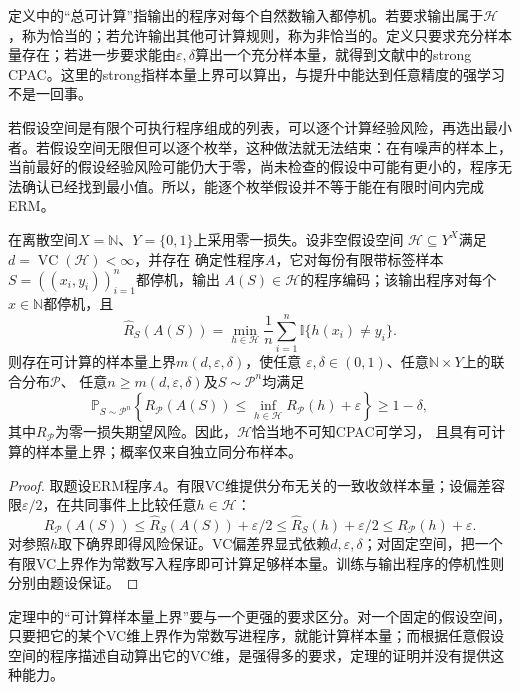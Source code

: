 定义中的“总可计算”指输出的程序对每个自然数输入都停机。若要求输出属于$\mathcal H$，称为恰当的；若允许输出其他可计算规则，称为非恰当的。定义只要求充分样本量存在；若进一步要求能由$\varepsilon,\delta$算出一个充分样本量，就得到文献中的strong CPAC。这里的strong指样本量上界可以算出，与提升中能达到任意精度的强学习不是一回事。

若假设空间是有限个可执行程序组成的列表，可以逐个计算经验风险，再选出最小者。若假设空间无限但可以逐个枚举，这种做法就无法结束：在有噪声的样本上，当前最好的假设经验风险可能仍大于零，尚未检查的假设中可能有更小的，程序无法确认已经找到最小值。所以，能逐个枚举假设并不等于能在有限时间内完成ERM。

\begin{theorem}[可计算ERM给出的学习保证]
\label{thm:computable-erm-pac}
在离散空间$X=\mathbb N$、$Y=\{0,1\}$上采用零一损失。设非空假设空间
$\mathcal H\subseteq Y^X$满足$d=\operatorname{VC}(\mathcal H)<\infty$，并存在
确定性程序$A$，它对每份有限带标签样本$S=((x_i,y_i))_{i=1}^n$都停机，输出
$A(S)\in\mathcal H$的程序编码；该输出程序对每个$x\in\mathbb N$都停机，且
\[
 \hat R_S(A(S))
 =\min_{h\in\mathcal H}\frac1n\sum_{i=1}^n\mathbb I\{h(x_i)\neq y_i\}.
\]
则存在可计算的样本量上界$m(d,\varepsilon,\delta)$，使任意
$\varepsilon,\delta\in(0,1)$、任意$\mathbb N\times Y$上的联合分布$\mathcal P$、
任意$n\geq m(d,\varepsilon,\delta)$及$S\sim\mathcal P^n$均满足
\[
 \mathbb P_{S\sim\mathcal P^n}\left\{
 R_{\mathcal P}(A(S))
 \leq\inf_{h\in\mathcal H}R_{\mathcal P}(h)+\varepsilon
 \right\}\geq1-\delta,
\]
其中$R_{\mathcal P}$为零一损失期望风险。因此，$\mathcal H$恰当地不可知CPAC可学习，
且具有可计算的样本量上界；概率仅来自独立同分布样本。
\end{theorem}

\begin{proof}
取题设ERM程序$A$。有限VC维提供分布无关的一致收敛样本量；设偏差容限$\varepsilon/2$，在共同事件上比较任意$h\in\mathcal H$：
\[
 R_{\mathcal P}(A(S))
 \leq\hat R_S(A(S))+\varepsilon/2
 \leq\hat R_S(h)+\varepsilon/2
 \leq R_{\mathcal P}(h)+\varepsilon.
\]
对参照$h$取下确界即得风险保证。VC偏差界显式依赖$d,\varepsilon,\delta$；对固定空间，把一个有限VC上界作为常数写入程序即可计算足够样本量。训练与输出程序的停机性则分别由题设保证。
\end{proof}

定理中的“可计算样本量上界”要与一个更强的要求区分。对一个固定的假设空间，只要把它的某个VC维上界作为常数写进程序，就能计算样本量；而根据任意假设空间的程序描述自动算出它的VC维，是强得多的要求，定理的证明并没有提供这种能力。


